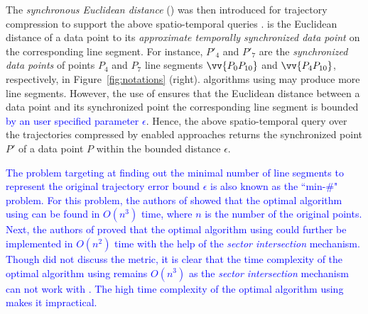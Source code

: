 

The \emph{synchronous Euclidean distance} (\sed) was then introduced for trajectory compression to support the above spatio-temporal queries \cite{Meratnia:Spatiotemporal}. \sed is the Euclidean distance of a data point to its \emph{approximate temporally synchronized data point \cite{Meratnia:Spatiotemporal}} on the corresponding line segment. For instance, $P'_4$ and $P'_7$ are the \emph{synchronized data points} of points $P_4$ and $P_7$ \wrt line segments $\vv{P_0P_{10}}$ and $\vv{P_4P_{10}}$, respectively, in Figure~\ref{fig:notations} (right).
\lsa algorithms using \sed may produce more line segments. However, the use of \sed ensures that the Euclidean distance between a data point and its  synchronized point \wrt the corresponding line segment is bounded \textcolor{blue}{by an user specified parameter $\epsilon$}. Hence, the above spatio-temporal query over the trajectories compressed by \sed enabled approaches returns the synchronized point $P'$ of a data point $P$ within the bounded distance $\epsilon$.


\textcolor{blue}{The problem targeting at finding out the minimal number of line segments to represent the original trajectory \wrt error bound $\epsilon$ is also known as the ``min-\#" problem\cite{Imai:Optimal,Chan:Optimal}. For this problem, 
	the authors of \cite{Imai:Optimal} showed that the optimal \lsa algorithm using \ped can be found in $O(n^3)$ time, where $n$ is the number of the original points. Next, the authors of \cite{Chan:Optimal} proved that the optimal algorithm using \ped could further be implemented in $O(n^2)$ time with the help of the \textit{sector intersection} mechanism. 
	Though \cite{Chan:Optimal} did not discuss the \sed metric, it is clear that the time complexity of the optimal \lsa algorithm using \sed remains $O(n^3)$ as the \textit{sector intersection} mechanism can not work with \sed. 
	The high time complexity of the optimal \lsa algorithm using \sed makes it impractical.
}



